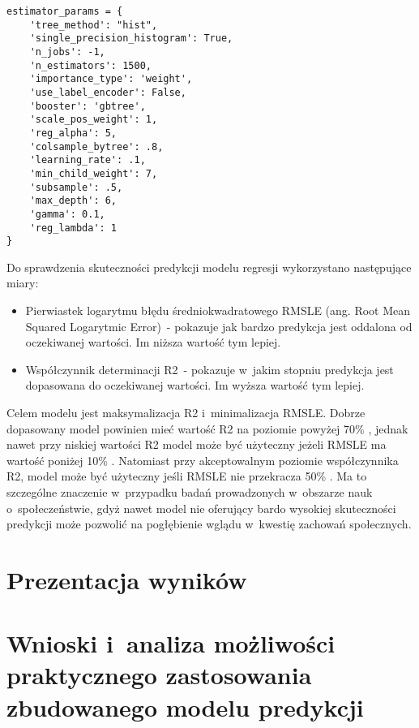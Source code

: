 \noindent\begin{minipage}{\textwidth}
             \begin{lstlisting}[caption={Parametry estmatora}, label={listing:estimator_params}]
             \end{lstlisting}
             \hspace{.075\textwidth}\begin{minipage}{.85\textwidth}
                                        \begin{verbatim}
estimator_params = {
    'tree_method': "hist",
    'single_precision_histogram': True,
    'n_jobs': -1,
    'n_estimators': 1500,
    'importance_type': 'weight',
    'use_label_encoder': False,
    'booster': 'gbtree',
    'scale_pos_weight': 1,
    'reg_alpha': 5,
    'colsample_bytree': .8,
    'learning_rate': .1,
    'min_child_weight': 7,
    'subsample': .5,
    'max_depth': 6,
    'gamma': 0.1,
    'reg_lambda': 1
}
        \end{verbatim}
     \end{minipage}

     \raggedright\source{\ownwork}
     \vspace{0.75cm}
\end{minipage}

Do sprawdzenia skuteczności predykcji modelu regresji wykorzystano następujące miary:
\begin{itemize}
    \item Pierwiastek logarytmu błędu średniokwadratowego RMSLE (ang. Root Mean Squared Logarytmic Error)~- pokazuje jak bardzo predykcja jest oddalona od oczekiwanej wartości. Im niższa wartość tym lepiej.
    \item Współczynnik determinacji R2~- pokazuje w~jakim stopniu predykcja jest dopasowana do oczekiwanej wartości. Im wyższa wartość tym lepiej.
    \end{itemize}

Celem modelu jest maksymalizacja R2 i~minimalizacja RMSLE. Dobrze dopasowany model powinien mieć wartość R2 na poziomie powyżej 70\% \cite{r2-good-value}, jednak nawet przy niskiej wartości R2 model może być użyteczny jeżeli RMSLE ma wartość poniżej 10\% \cite{r2-vs-rmse}.
Natomiast przy akceptowalnym poziomie współczynnika R2, model może być użyteczny jeśli RMSLE nie przekracza 50\% \cite{rmse-good-value}.
Ma to szczególne znaczenie w~przypadku badań prowadzonych w~obszarze nauk o~społeczeństwie, gdyż nawet model nie oferujący bardo wysokiej skuteczności predykcji może pozwolić na pogłębienie wglądu w~kwestię zachowań społecznych.

\section{Prezentacja wyników}\label{sec:analysis:important-features}
\todo{}
\section{Wnioski i~analiza możliwości praktycznego zastosowania zbudowanego modelu predykcji}\label{sec:analysis:model-fitness}

\thispagestyle{normal}
